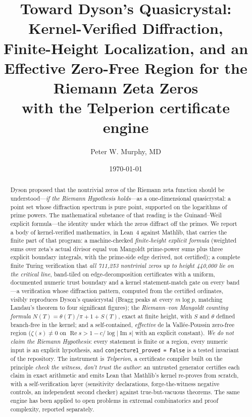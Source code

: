 \documentclass[11pt]{article}
\title{Toward Dyson's Quasicrystal:\\ Kernel-Verified Diffraction,\\ Finite-Height Localization, and an\\ Effective Zero-Free Region for the\\ Riemann Zeta Zeros\\[0.6em] \large with the Telperion certificate engine}
\author{Peter W. Murphy, MD}
\date{\today}
\newcommand{\ladderHeight}{440{,}000}
\newcommand{\ladderCount}{711{,}253}
\begin{document}
\maketitle

\begin{abstract}
Dyson proposed that the nontrivial zeros of the Riemann zeta function should be
understood---\emph{if the Riemann Hypothesis holds}---as a one-dimensional
quasicrystal: a point set whose diffraction spectrum is pure point, supported on
the logarithms of prime powers. The
mathematical substance of that reading is the Guinand--Weil explicit formula---the
identity under which the zeros diffract off the primes. We report a body of
kernel-verified mathematics, in Lean~4 against Mathlib, that carries the finite
part of that program: a machine-checked \emph{finite-height explicit formula}
(weighted sums over zeta's actual divisor equal von Mangoldt prime-power sums plus
three explicit boundary integrals, with the prime-side edge derived, not
certified); a complete finite Turing verification that \emph{all \ladderCount{}
nontrivial zeros up to height \ladderHeight{} lie on the critical line},
band-tiled on edge-decomposition certificates with a uniform, documented numeric
trust boundary and a kernel statement-match gate on every band---a verification
whose diffraction pattern, computed from the certified ordinates, visibly
reproduces Dyson's quasicrystal (Bragg peaks at every $m\log p$, matching
Landau's theorem to four significant figures); the \emph{Riemann--von Mangoldt counting
formula} $N(T) = \theta(T)/\pi + 1 + S(T)$, exact at finite height, with
$S$ and $\theta$ defined branch-free in the kernel; and a self-contained, \emph{effective} de la
Vallée-Poussin zero-free region ($\zeta(s) \ne 0$ on $\operatorname{Re} s > 1 -
c/\log|\operatorname{Im} s|$ with an explicit constant). \emph{We do not claim the
Riemann Hypothesis}: every statement is finite or a region, every numeric input is
an explicit hypothesis, and \texttt{conjecture1\_proved = False} is a tested
invariant of the repository. The instrument is \emph{Telperion}, a certificate
compiler built on the principle \emph{check the witness, don't trust the author}:
an untrusted generator certifies each claim in exact arithmetic and emits Lean
that Mathlib's kernel re-proves from scratch, with a self-verification layer
(sensitivity declarations, forge-the-witness negative controls, an independent
second checker) against true-but-vacuous theorems. The same engine has been
applied to open problems in extremal combinatorics and proof complexity,
reported separately.
\end{abstract}










\appendix





\end{document}
